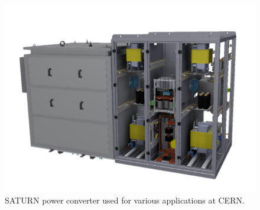 \documentclass[a4paper, 10pt, conference]{ieeeconf}
\begin{document}
\begin{figure}
\centering
\includegraphics[width=\columnwidth]{../pics/Saturn_1}
\caption{SATURN power converter used for various applications at CERN.}
\label{fig:saturn_pc}
\end{figure} 

\end{document}
